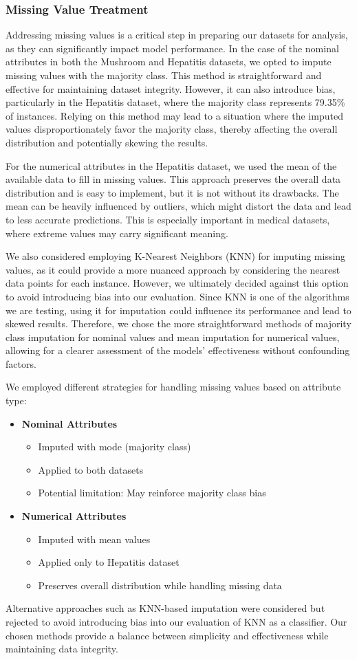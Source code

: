 \subsubsection{Missing Value Treatment}
Addressing missing values is a critical step in preparing our datasets for analysis, as they can significantly impact model performance.
In the case of the nominal attributes in both the Mushroom and Hepatitis datasets, we opted to impute missing values with the majority class.
This method is straightforward and effective for maintaining dataset integrity.
However, it can also introduce bias, particularly in the Hepatitis dataset, where the majority class represents 79.35\% of instances.
Relying on this method may lead to a situation where the imputed values disproportionately favor the majority class, thereby affecting the overall distribution and potentially skewing the results.

For the numerical attributes in the Hepatitis dataset, we used the mean of the available data to fill in missing values.
This approach preserves the overall data distribution and is easy to implement, but it is not without its drawbacks.
The mean can be heavily influenced by outliers, which might distort the data and lead to less accurate predictions.
This is especially important in medical datasets, where extreme values may carry significant meaning.

We also considered employing K-Nearest Neighbors (KNN) for imputing missing values, as it could provide a more nuanced approach by considering the nearest data points for each instance.
However, we ultimately decided against this option to avoid introducing bias into our evaluation.
Since KNN is one of the algorithms we are testing, using it for imputation could influence its performance and lead to skewed results.
Therefore, we chose the more straightforward methods of majority class imputation for nominal values and mean imputation for numerical values, allowing for a clearer assessment of the models’ effectiveness without confounding factors.

We employed different strategies for handling missing values based on attribute type:

\begin{itemize}
    \item \textbf{Nominal Attributes}
    \begin{itemize}
        \item Imputed with mode (majority class)
        \item Applied to both datasets
        \item Potential limitation: May reinforce majority class bias
    \end{itemize}
    
    \item \textbf{Numerical Attributes}
    \begin{itemize}
        \item Imputed with mean values
        \item Applied only to Hepatitis dataset
        \item Preserves overall distribution while handling missing data
    \end{itemize}
\end{itemize}

Alternative approaches such as KNN-based imputation were considered but rejected to avoid introducing bias into our evaluation of KNN as a classifier. Our chosen methods provide a balance between simplicity and effectiveness while maintaining data integrity.


